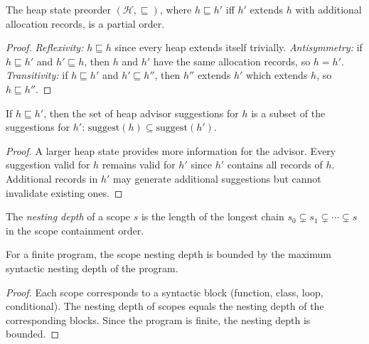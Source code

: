 \documentclass[11pt]{article}
\begin{document}
\begin{lemma}
\label{lem:heap-po}
The heap state preorder $(\mathcal{H}, \sqsubseteq)$, where
$h \sqsubseteq h'$ iff $h'$ extends $h$ with additional
allocation records, is a partial order.
\end{lemma}

\begin{proof}
\emph{Reflexivity:} $h \sqsubseteq h$ since every heap extends
itself trivially.
\emph{Antisymmetry:} if $h \sqsubseteq h'$ and $h' \sqsubseteq h$,
then $h$ and $h'$ have the same allocation records, so $h = h'$.
\emph{Transitivity:} if $h \sqsubseteq h'$ and $h' \sqsubseteq h''$,
then $h''$ extends $h'$ which extends $h$, so $h \sqsubseteq h''$.
\end{proof}

\begin{lemma}
\label{lem:heap-mono}
If $h \sqsubseteq h'$, then the set of heap advisor suggestions
for $h$ is a subset of the suggestions for $h'$:
$\mathrm{suggest}(h) \subseteq \mathrm{suggest}(h')$.
\end{lemma}

\begin{proof}
A larger heap state provides more information for the advisor.
Every suggestion valid for $h$ remains valid for $h'$ since $h'$
contains all records of $h$.  Additional records in $h'$ may
generate additional suggestions but cannot invalidate existing ones.
\end{proof}

\begin{definition}
\label{def:scope-depth}
The \emph{nesting depth} of a scope $s$ is the length of the
longest chain $s_0 \subsetneq s_1 \subsetneq \cdots \subsetneq s$
in the scope containment order.
\end{definition}

\begin{lemma}
\label{lem:scope-wf}
For a finite program, the scope nesting depth is bounded by the
maximum syntactic nesting depth of the program.
\end{lemma}

\begin{proof}
Each scope corresponds to a syntactic block (function, class, loop,
conditional).  The nesting depth of scopes equals the nesting
depth of the corresponding blocks.  Since the program is finite,
the nesting depth is bounded.
\end{proof}
\end{document}
